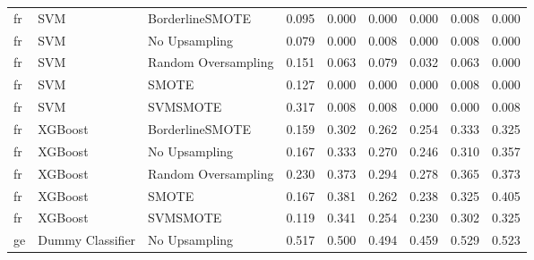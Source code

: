 \begin{tabular}{lllllllll}
      fr &                          SVM &     BorderlineSMOTE & 0.095 &                     0.000 &                 0.000 &                  0.000 &                                   0.008 &     0.000 \\
      fr &                          SVM &       No Upsampling & 0.079 &                     0.000 &                 0.008 &                  0.000 &                                   0.008 &     0.000 \\
      fr &                          SVM & Random Oversampling & 0.151 &                     0.063 &                 0.079 &                  0.032 &                                   0.063 &     0.000 \\
      fr &                          SVM &               SMOTE & 0.127 &                     0.000 &                 0.000 &                  0.000 &                                   0.008 &     0.000 \\
      fr &                          SVM &            SVMSMOTE & 0.317 &                     0.008 &                 0.008 &                  0.000 &                                   0.000 &     0.008 \\
      fr &                      XGBoost &     BorderlineSMOTE & 0.159 &                     0.302 &                 0.262 &                  0.254 &                                   0.333 &     0.325 \\
      fr &                      XGBoost &       No Upsampling & 0.167 &                     0.333 &                 0.270 &                  0.246 &                                   0.310 &     0.357 \\
      fr &                      XGBoost & Random Oversampling & 0.230 &                     0.373 &                 0.294 &                  0.278 &                                   0.365 &     0.373 \\
      fr &                      XGBoost &               SMOTE & 0.167 &                     0.381 &                 0.262 &                  0.238 &                                   0.325 &     0.405 \\
      fr &                      XGBoost &            SVMSMOTE & 0.119 &                     0.341 &                 0.254 &                  0.230 &                                   0.302 &     0.325 \\
      ge &             Dummy Classifier &       No Upsampling & 0.517 &                     0.500 &                 0.494 &                  0.459 &                                   0.529 &     0.523 \\

\end{tabular}
